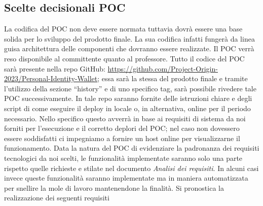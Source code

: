 \subsection{Scelte decisionali POC}

La codifica del POC non deve essere normata tuttavia dovrà essere una base solida per lo sviluppo del prodotto finale. La sua codifica infatti fungerà da linea guisa architettura delle componenti che dovranno essere realizzate. Il POC verrà reso disponibile al committente quanto al professore. Tutto il codice del POC sarà presente nella repo GitHub: \url{https://github.com/Project-Origin-2023/Personal-Identity-Wallet}; essa sarà la stessa del prodotto finale e tramite l’utilizzo della sezione “history” e di uno specifico tag, sarà possibile rivedere tale POC successivamente. In tale repo saranno fornite delle istruzioni chiare e degli script di come eseguire il deploy in locale o, in alternativa, online per il periodo necessario. Nello specifico questo avverrà in base ai requisiti di sistema da noi forniti per l’esecuzione e il corretto deplori del POC; nel caso non dovessero essere soddisfatti ci impegniamo a fornire un host online per visualizzarne il funzionamento. 
Data la natura del POC di evidenziare la padronanza dei requisiti tecnologici da noi scelti,  le funzionalità implementate saranno solo una parte rispetto quelle richieste e stilate nel documento \textit{Analisi dei requisiti}. In alcuni casi invece queste funzionalità saranno implementate ma in maniera automatizzata per snellire la mole di lavoro mantenendone la finalità. 
Si pronostica la realizzazione dei seguenti requisiti
